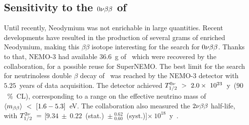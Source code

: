 \subsection{Sensitivity to the $0\nu\beta\beta$ of \Nd}

Until recently, Neodymium was not enrichable in large quantities.
Recent developments have resulted in the production of several grams of enriched Neodymium, making this $\beta\beta$ isotope interesting for the search for $0\nu\beta\beta$.
Thanks to that, NEMO-$3$ had available $36.6$~g of \Nd\ which were recovered by the collaboration, for a possible reuse for SuperNEMO.
The best limit for the search for neutrinoless double $\beta$ decay of \Nd\ was reached by the NEMO-$3$ detector with $5.25$~years of data acquisition.
The detector achieved $T_{1/2}^{0\nu}~>~2.0\times~10^{23}$~y~($90$~\%~CL), corresponding to a range on the effective neutrino mass of $\langle m_{\beta\beta}\rangle~<~[1.6-5.3]$~eV.
The collaboration also measured the $2\nu\beta\beta$ half-life, with $T_{1/2}^{2\nu}~=~$[$9.34~\pm~0.22$~(stat.)~$\pm~^{0.62}_{0.60}$~(syst.)]$\times~10^{18}$~y~\cite{art:NEMO3_Nd}.

